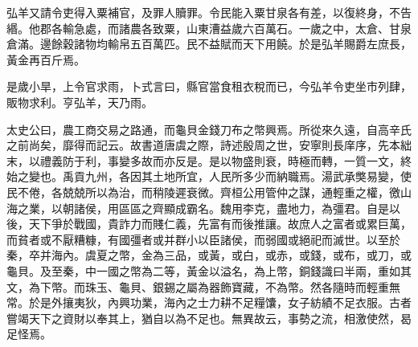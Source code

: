 弘羊又請令吏得入粟補官，及罪人贖罪。令民能入粟甘泉各有差，以復終身，不告緡。他郡各輸急處，而諸農各致粟，山東漕益歲六百萬石。一歲之中，太倉、甘泉倉滿。邊餘穀諸物均輸帛五百萬匹。民不益賦而天下用饒。於是弘羊賜爵左庶長，黃金再百斤焉。

是歲小旱，上令官求雨，卜式言曰，縣官當食租衣稅而已，今弘羊令吏坐市列肆，販物求利。亨弘羊，天乃雨。

太史公曰，農工商交易之路通，而龜貝金錢刀布之幣興焉。所從來久遠，自高辛氏之前尚矣，靡得而記云。故書道唐虞之際，詩述殷周之世，安寧則長庠序，先本絀末，以禮義防于利，事變多故而亦反是。是以物盛則衰，時極而轉，一質一文，終始之變也。禹貢九州，各因其土地所宜，人民所多少而納職焉。湯武承獘易變，使民不倦，各兢兢所以為治，而稍陵遲衰微。齊桓公用管仲之謀，通輕重之權，徼山海之業，以朝諸侯，用區區之齊顯成霸名。魏用李克，盡地力，為彊君。自是以後，天下爭於戰國，貴詐力而賤仁義，先富有而後推讓。故庶人之富者或累巨萬，而貧者或不厭糟糠，有國彊者或并群小以臣諸侯，而弱國或絕祀而滅世。以至於秦，卒并海內。虞夏之幣，金為三品，或黃，或白，或赤，或錢，或布，或刀，或龜貝。及至秦，中一國之幣為二等，黃金以溢名，為上幣，銅錢識曰半兩，重如其文，為下幣。而珠玉、龜貝、銀錫之屬為器飾寶藏，不為幣。然各隨時而輕重無常。於是外攘夷狄，內興功業，海內之士力耕不足糧馕，女子紡績不足衣服。古者嘗竭天下之資財以奉其上，猶自以為不足也。無異故云，事勢之流，相激使然，曷足怪焉。